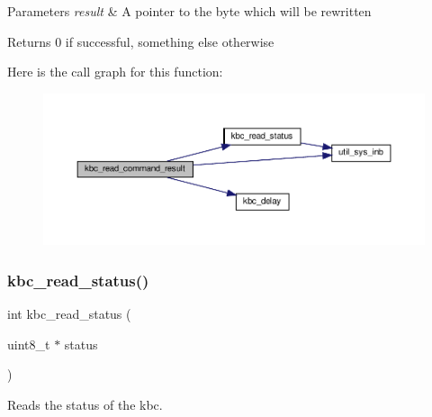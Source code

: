 \begin{DoxyParams}{Parameters}
{\em result} & A pointer to the byte which will be rewritten \\
\hline
\end{DoxyParams}
\begin{DoxyReturn}{Returns}
0 if successful, something else otherwise 
\end{DoxyReturn}
Here is the call graph for this function\+:\nopagebreak
\begin{figure}[H]
\begin{center}
\leavevmode
\includegraphics[width=350pt]{group__kbc_ga65f11cca39a73154ab68dabac8b12683_cgraph}
\end{center}
\end{figure}
\mbox{\label{group__kbc_gaa4c58a11cd49c54cc0eb02a79010a9cc}} 
\subsubsection{\texorpdfstring{kbc\+\_\+read\+\_\+status()}{kbc\_read\_status()}}
{\footnotesize\ttfamily int kbc\+\_\+read\+\_\+status (\begin{DoxyParamCaption}\item[{uint8\+\_\+t $\ast$}]{status }\end{DoxyParamCaption})}



Reads the status of the kbc. 


